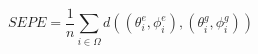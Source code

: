 \begin{equation}\label{equ:exp:epesph}
	{SEPE} = \frac{1}{n} \sum_{i \in \Omega} d\left( (\theta^e_i,\phi^e_i), (\theta^g_i,\phi^g_i)\right) 
\end{equation}






